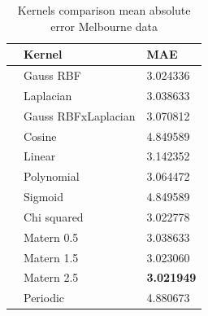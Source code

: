 \begin{table}[!h]
    \caption{Kernels comparison mean absolute error Melbourne data}
    \label{tab:kernel mae comparison}
    \begin{center}
    \begin{tabular}{lll}
        \toprule
         & Kernel & MAE \\
        \midrule
        & Gauss RBF &  3.024336 \\
        & Laplacian &  3.038633 \\
        & Gauss RBFxLaplacian &  3.070812\\
        & Cosine &    4.849589 \\
        & Linear &     3.142352\\
        & Polynomial &     3.064472 \\
        & Sigmoid &      4.849589       \\
        & Chi squared &    3.022778    \\
        & Matern 0.5 &  3.038633 \\
        & Matern 1.5 &  3.023060 \\
        & Matern 2.5 &  \textbf{3.021949} \\
        & Periodic  & 4.880673 \\
        \bottomrule
        \end{tabular}
    \end{center}
    \end{table}  



